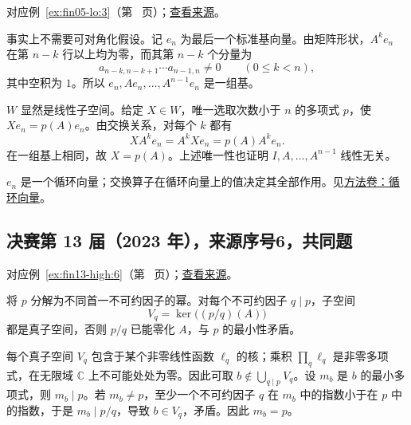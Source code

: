 \documentclass[UTF8,12pt,a4paper,fontset=fandol]{ctexart}
\begin{document}
对应例~\ref{ex:fin05-lo:3}（第~\pageref{ex:fin05-lo:3} 页）；\href{https://github.com/lzxcr/cmc-mathematics/blob/64916fa1fdbc3e444a652eca204d5669058ee321/src/problems/finals/05/06.md}{查看来源}。

\begin{solve}

事实上不需要可对角化假设。记 $e_n$ 为最后一个标准基向量。由矩阵形状，$A^ke_n$ 在第 $n-k$ 行以上均为零，而其第 $n-k$ 个分量为
\[
a_{n-k,n-k+1}\cdots a_{n-1,n}\ne0\qquad(0\le k<n),
\]
其中空积为 $1$。所以 $e_n,Ae_n,\ldots,A^{n-1}e_n$ 是一组基。

$W$ 显然是线性子空间。给定 $X\in W$，唯一选取次数小于 $n$ 的多项式 $p$，使 $Xe_n=p(A)e_n$。由交换关系，对每个 $k$ 都有
\[
XA^ke_n=A^kXe_n=p(A)A^ke_n.
\]
在一组基上相同，故 $X=p(A)$。上述唯一性也证明 $I,A,\ldots,A^{n-1}$ 线性无关。

\end{solve}

\begin{remark}[方法与条件]

$e_n$ 是一个循环向量；交换算子在循环向量上的值决定其全部作用。见\hyperref[app:linear-cyclic]{方法卷：循环向量}。

\end{remark}

\subsection{决赛第 13 届（2023 年），来源序号6，共同题}\label{ans:fin13-high:6}\label{pr:fin13-high:6}

对应例~\ref{ex:fin13-high:6}（第~\pageref{ex:fin13-high:6} 页）；\href{https://github.com/lzxcr/cmc-mathematics/blob/64916fa1fdbc3e444a652eca204d5669058ee321/src/problems/finals/13/06.md}{查看来源}。

\begin{solve}

将 $p$ 分解为不同首一不可约因子的幂。对每个不可约因子 $q\mid p$，子空间
\[
V_q=\ker\bigl((p/q)(A)\bigr)
\]
都是真子空间，否则 $p/q$ 已能零化 $A$，与 $p$ 的最小性矛盾。

每个真子空间 $V_q$ 包含于某个非零线性函数 $\ell_q$ 的核；乘积 $\prod_q\ell_q$ 是非零多项式，在无限域 $\mathbb C$ 上不可能处处为零。因此可取 $b\notin\bigcup_{q\mid p}V_q$。设 $m_b$ 是 $b$ 的最小多项式，则 $m_b\mid p$。若 $m_b\ne p$，至少一个不可约因子 $q$ 在 $m_b$ 中的指数小于在 $p$ 中的指数，于是 $m_b\mid p/q$，导致 $b\in V_q$，矛盾。因此 $m_b=p$。

\end{solve}
\end{document}
